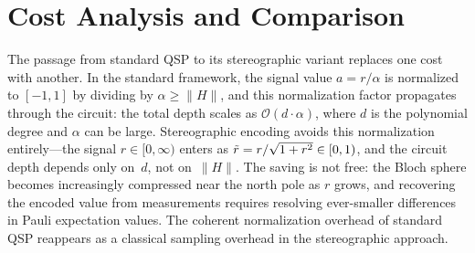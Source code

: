 \section{Cost Analysis and Comparison}
\label{sec:cost-analysis}


The passage from standard QSP to its stereographic variant
replaces one cost with another.  In the standard framework, the
signal value $a = r/\alpha$ is normalized to $[-1,1]$ by dividing
by $\alpha \geq \|H\|$, and this normalization factor propagates
through the circuit: the total depth scales as
$\mathcal{O}(d \cdot \alpha)$, where $d$ is the polynomial degree
and $\alpha$ can be large.  Stereographic encoding avoids this
normalization entirely---the signal $r \in [0,\infty)$ enters as
$\tilde{r} = r/\sqrt{1+r^2} \in [0,1)$, and the circuit depth depends
only on~$d$, not on~$\|H\|$.  The saving is not free: the Bloch
sphere becomes increasingly compressed near the north pole as
$r$ grows, and recovering the encoded value from measurements
requires resolving ever-smaller differences in Pauli expectation
values.  The coherent normalization overhead of standard QSP
reappears as a classical sampling overhead in the stereographic
approach.


